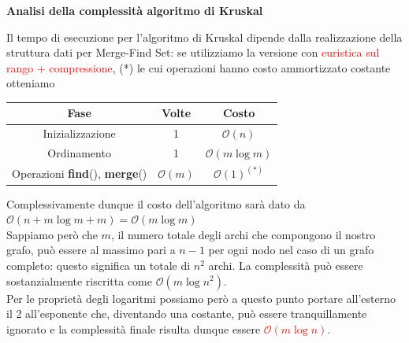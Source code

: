 \documentclass[../cheatSheetAlgoritmi.tex]{subfiles}
\begin{document}
\bigskip

\textbf{Analisi della complessità algoritmo di Kruskal}

Il tempo di esecuzione per l'algoritmo di Kruskal dipende dalla realizzazione della struttura dati per Merge-Find Set: se utilizziamo la versione con \textcolor{red}{euristica sul rango + compressione}, (*) le cui operazioni hanno costo ammortizzato costante otteniamo
\begin{center}
	\renewcommand{\arraystretch}{1.2}
	\begin{tabular}{ |c|c|c| } 
		\hline
			\textbf{Fase} & \textbf{Volte} & \textbf{Costo}\\ 
		\hline
			Inizializzazione & 1 &  $\mathcal{O}(n)$\\ 
		\hline
			Ordinamento & 1 &  $\mathcal{O}(m \log m)$ \\
		\hline
			Operazioni \textbf{find}(), \textbf{merge}() & $\mathcal{O}(m)$ & $\mathcal{O}(1)^{(*)}$\\
		\hline
	\end{tabular}
\end{center}
Complessivamente dunque il costo dell'algoritmo sarà dato da $\mathcal{O}(n + m \log m + m) = \mathcal{O}(m \log m)$\\
Sappiamo però che $m$, il numero totale degli archi che compongono il nostro grafo, può essere al massimo pari a $n-1$ per ogni nodo nel caso di un grafo completo: questo significa un totale di $n^{2}$ archi. La complessità può essere sostanzialmente riscritta come $\mathcal{O}(m \log n^{2})$.\\
Per le proprietà degli logaritmi possiamo però a questo punto portare all'esterno il 2 all'esponente che, diventando una costante, può essere tranquillamente ignorato e la complessità finale risulta dunque essere \textcolor{red}{$\mathcal{O}(m \log n)$}.
 
\end{document}
